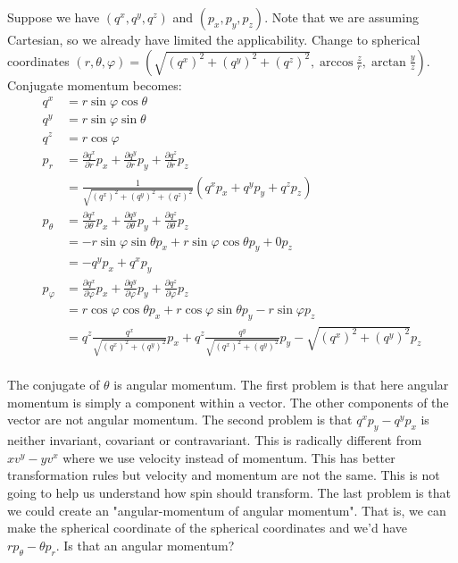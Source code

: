 \documentclass[11pt,letterpaper,fleqn]{memoir} %
\begin{document}
Suppose we have $(q^x, q^y, q^z)$ and $(p_x, p_y, p_z)$. Note that we are assuming Cartesian, so we already have limited the applicability. Change to spherical coordinates $(r,\theta,\varphi) = (\sqrt{(q^x)^2 + (q^y)^2 + (q^z)^2 }, \arccos \frac{z}{r}, \arctan \frac{y}{z})$. Conjugate momentum becomes:
\begin{align*}
	q^x &= r \sin \varphi \cos \theta \\
	q^y &= r \sin \varphi \sin \theta \\
	q^z &= r \cos \varphi \\
	p_r&= \frac{\partial q^x}{\partial r} p_x + \frac{\partial q^y}{\partial r} p_y + \frac{\partial q^z}{\partial r} p_z \\
	&= \frac{1}{\sqrt{(q^x)^2 + (q^y)^2 + (q^z)^2 }} (q^x p_x + q^y p_y + q^z p_z) \\
	p_\theta&= \frac{\partial q^x}{\partial \theta} p_x + \frac{\partial q^y}{\partial \theta} p_y + \frac{\partial q^z}{\partial \theta} p_z \\
	&= - r \sin \varphi \sin \theta p_x + r \sin \varphi \cos \theta p_y + 0 p_z \\
	&= - q^y p_x + q^x p_y \\
	p_\varphi&= \frac{\partial q^x}{\partial \varphi} p_x + \frac{\partial q^y}{\partial \varphi} p_y + \frac{\partial q^z}{\partial \varphi} p_z \\
	&= r \cos \varphi \cos \theta p_x + r \cos \varphi \sin \theta p_y - r \sin \varphi p_z \\
	&= q^z \frac{q^x}{\sqrt{(q^x)^2 + (q^y)^2}} p_x + q^z \frac{q^y}{\sqrt{(q^x)^2 + (q^y)^2}} p_y - \sqrt{(q^x)^2 + (q^y)^2} p_z \\
\end{align*}

The conjugate of $\theta$ is angular momentum. The first problem is that here angular momentum is simply a component within a vector. The other components of the vector are not angular momentum. The second problem is that $q^x p_y - q^y p_x$ is neither invariant, covariant or contravariant. This is radically different from $x v^y - y v^x$ where we use velocity instead of momentum. This has better transformation rules but velocity and momentum are not the same. This is not going to help us understand how spin should transform. The last problem is that we could create an "angular-momentum of angular momentum". That is, we can make the spherical coordinate of the spherical coordinates and we'd have $r p_\theta - \theta p_r$. Is that an angular momentum?
\end{document}
